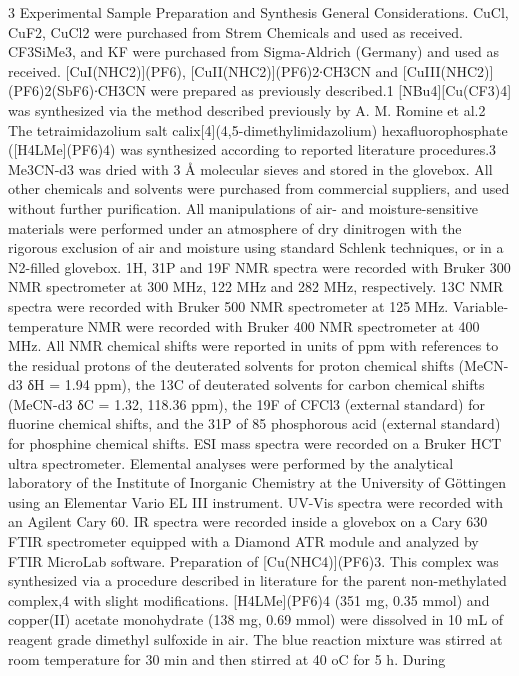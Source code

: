 3 
Experimental 
Sample Preparation and Synthesis 
General Considerations. CuCl, CuF2, CuCl2 were purchased from Strem Chemicals and used as received. 
CF3SiMe3, and KF were purchased from Sigma-Aldrich (Germany) and used as received. [CuI(NHC2)](PF6), 
[CuII(NHC2)](PF6)2∙CH3CN and [CuIII(NHC2)](PF6)2(SbF6)∙CH3CN were prepared as previously described.1 
[NBu4][Cu(CF3)4] was synthesized via the method described previously by A. M. Romine et al.2 The 
tetraimidazolium salt calix[4](4,5-dimethylimidazolium) hexafluorophosphate ([H4LMe](PF6)4) was synthesized 
according to reported literature procedures.3 Me3CN-d3 was dried with 3 Å molecular sieves and stored in the 
glovebox. All other chemicals and solvents were purchased from commercial suppliers, and used without further 
purification. All manipulations of air- and moisture-sensitive materials were performed under an atmosphere of 
dry dinitrogen with the rigorous exclusion of air and moisture using standard Schlenk techniques, or in a N2-filled 
glovebox. 1H, 31P and 19F NMR spectra were recorded with Bruker 300 NMR spectrometer at 300 MHz, 122 MHz 
and 282 MHz, respectively. 13C NMR spectra were recorded with Bruker 500 NMR spectrometer at 125 MHz. 
Variable-temperature NMR were recorded with Bruker 400 NMR spectrometer at 400 MHz. All NMR chemical 
shifts were reported in units of ppm with references to the residual protons of the deuterated solvents for proton 
chemical shifts (MeCN-d3 δH = 1.94 ppm), the 13C of deuterated solvents for carbon chemical shifts (MeCN-d3 
δC = 1.32, 118.36 ppm), the 19F of CFCl3 (external standard) for fluorine chemical shifts, and the 31P of 85%
phosphorous acid (external standard) for phosphine chemical shifts. ESI mass spectra were recorded on a Bruker 
HCT ultra spectrometer. Elemental analyses were performed by the analytical laboratory of the Institute of 
Inorganic Chemistry at the University of Göttingen using an Elementar Vario EL III instrument. UV-Vis spectra 
were recorded with an Agilent Cary 60. IR spectra were recorded inside a glovebox on a Cary 630 FTIR 
spectrometer equipped with  a Diamond ATR module and analyzed by FTIR MicroLab software. 
Preparation of [Cu(NHC4)](PF6)3. This complex was synthesized via a procedure described in literature for 
the parent non-methylated complex,4 with slight modifications. [H4LMe](PF6)4 (351 mg, 0.35 mmol) and copper(II) 
acetate monohydrate (138 mg, 0.69 mmol) were dissolved in 10 mL of reagent grade dimethyl sulfoxide in air. 
The blue reaction mixture was stirred at room temperature for 30 min and then stirred at 40 oC for 5 h. During 
